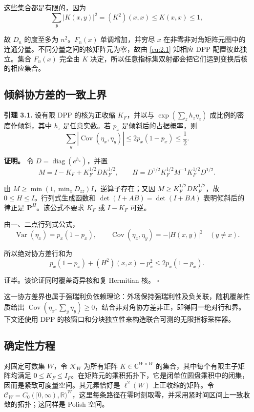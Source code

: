 \documentclass[UTF8,zihao=-4,a4paper]{ctexart}
\numberwithin{equation}{section}
\begin{document}
这些集合都是有限的，因为
\[
 \sum_y|K(x,y)|^2=(K^2)(x,x)\le K(x,x)\le1,
\]

故 \(D_n\) 的度至多为 \(n^2\)。\(F_n(x)\) 单调增加，并穷尽 \(x\) 在非零非对角矩阵元图中的连通分量。不同分量之间的核矩阵元为零，故由 \eqref{eq:2.1} 知相应 DPP 配置彼此独立。集合 \(F_n(x)\) 完全由 \(K\) 决定，所以任意指标集双射都会把它们运到变换后核的相应集合。

\subsection{倾斜协方差的一致上界}

\textbf{引理 3.1.} 设有限 DPP 的核为正收缩 \(K_F\)，并以与
\(\exp(\sum_z h_z\eta_z)\) 成比例的密度作倾斜，其中 \(h_z\) 是任意实数。若 \(p_x\) 是倾斜后的占据概率，则
\[
 \sum_y|\operatorname{Cov}(\eta_x,\eta_y)|
 \le 2p_x(1-p_x)\le\frac12.
 \tag{3.1}\label{eq:3.1}
\]


\textbf{证明。} 令 \(D=\operatorname{diag}(e^{h_z})\)，并置
\[
 M=I-K_F+K_F^{1/2}DK_F^{1/2},\qquad
 H=D^{1/2}K_F^{1/2}M^{-1}K_F^{1/2}D^{1/2}.
\]

由 \(M\ge\min(1,\min_zD_{zz})I\)，逆算子存在；又因
\(M\ge K_F^{1/2}DK_F^{1/2}\)，故 \(0\le H\le I\)。行列式生成函数和
\(\det(I+AB)=\det(I+BA)\) 表明倾斜后的律正是 \(\mathbf P^H\)。该公式不要求
\(K_F\) 或 \(I-K_F\) 可逆。

由一、二点行列式公式，
\[
 \operatorname{Var}(\eta_x)=p_x(1-p_x),\qquad
 \operatorname{Cov}(\eta_x,\eta_y)=-|H(x,y)|^2\quad(y\ne x).
\]

所以绝对协方差行和为
\[
 p_x(1-p_x)+(H^2)(x,x)-p_x^2
 \le 2p_x(1-p_x).
\]

证毕。该论证同时覆盖奇异核和复 Hermitian 核。 \(\square\)

这一协方差界也属于强瑞利负依赖理论：外场保持强瑞利性及负关联\cite[Theorem~4.9]{BBL}，随机覆盖性质\cite[Proposition~2.2]{PP}给出 $\operatorname{Cov}(\eta_x,\sum_y\eta_y)\ge0$，结合非对角协方差非正，即得同一绝对行和界。下文还使用 DPP 的核窗口和分块独立性来构造联合可测的无限指标采样器。

\subsection{确定性方程}

对固定可数集 \(W\)，令 \(\mathscr K_W\) 为所有矩阵 \(K\in\mathbb C^{W\times W}\) 的集合，其中每个有限主子矩阵均满足 \(0\le K_F\le I_F\)。在矩阵元的乘积拓扑下，它是闭单位圆盘乘积中的闭集，因而是紧致可度量空间。其元素恰好是 \(\ell^2(W)\) 上正收缩的矩阵。令
\(\mathcal C_W=C_0([0,\infty),\mathbb R)^W\)，这里每条路径在零时刻取零，并采用紧时间区间上一致收敛的拓扑；这同样是 Polish 空间。
\end{document}
